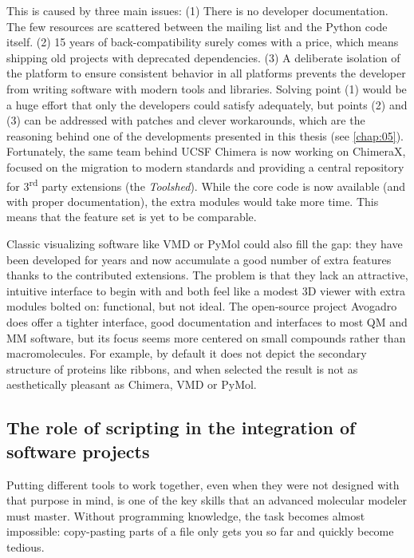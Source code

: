 This is caused by three main issues: (1) There is no developer documentation. The few resources are scattered between the mailing list and the Python code itself. (2) 15 years of back-compatibility surely comes with a price, which means shipping old projects with deprecated dependencies. (3) A deliberate isolation of the platform to ensure consistent behavior in all platforms prevents the developer from writing software with modern tools and libraries. Solving point (1) would be a huge effort that only the developers could satisfy adequately, but points (2) and (3) can be addressed with patches and clever workarounds, which are the reasoning behind one of the developments presented in this thesis (see \autoref{chap:05}). Fortunately, the same team behind UCSF Chimera is now working on ChimeraX, focused on the migration to modern standards and providing a central repository for 3\textsuperscript{rd} party extensions (the \textit{Toolshed}). While the core code is now available (and with proper documentation), the extra modules would take more time. This means that the feature set is yet to be comparable.

Classic visualizing software like VMD or PyMol could also fill the gap: they have been developed for years and now accumulate a good number of extra features thanks to the contributed extensions. The problem is that they lack an attractive, intuitive interface to begin with and both feel like a modest 3D viewer with extra modules bolted on: functional, but not ideal. The open-source project Avogadro does offer a tighter interface, good documentation and interfaces to most QM and MM software, but its focus seems more centered on small compounds rather than macromolecules. For example, by default it does not depict the secondary structure of proteins like ribbons, and when selected the result is not as aesthetically pleasant as Chimera, VMD or PyMol.





\subsection{The role of scripting in the integration of software projects}

Putting different tools to work together, even when they were not designed with that purpose in mind, is one of the key skills that an advanced molecular modeler must master. Without programming knowledge, the task becomes almost impossible: copy-pasting parts of a file only gets you so far and quickly become tedious.

